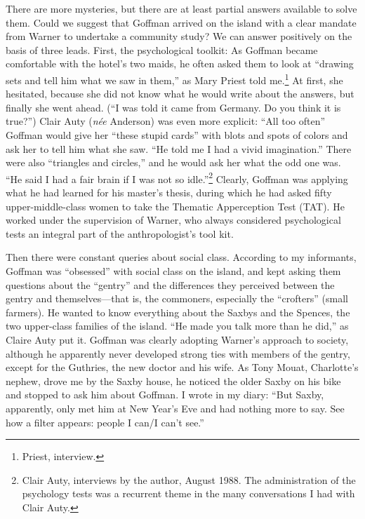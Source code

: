 \documentclass[openany,nobib]{tufte-book}
\begin{document}
There are more mysteries, but there are at least partial answers
available to solve them. Could we suggest that Goffman arrived on the
island with a clear mandate from Warner to undertake a community study?
We can answer positively on the basis of three leads. First, the
psychological toolkit: As Goffman became comfortable with the hotel's
two maids, he often asked them to look at ``drawing sets and tell him
what we saw in them,'' as Mary Priest told me.\footnote{Priest,
  interview.} At first, she hesitated, because she did not know what he
would write about the answers, but finally she went ahead. (``I was told
it came from Germany. Do you think it is true?'') Clair Auty (\emph{n\'ee} Anderson) was even
more explicit: ``All too often'' Goffman would give her ``these stupid
cards'' with blots and spots of colors and ask her to tell him what she
saw. ``He told me I had a vivid imagination.'' There were also
``triangles and circles,'' and he would ask her what the odd one was.
``He said I had a fair brain if I was not so idle.''\footnote{Clair
  Auty, interviews by the author, August 1988. The administration of
  the psychology tests was a recurrent theme in the many conversations I
  had with Clair Auty.} Clearly, Goffman was applying what he had
learned for his master's thesis, during which he had asked fifty
upper-middle-class women to take the Thematic Apperception Test (TAT).
He worked under the supervision of Warner, who always considered
psychological tests an integral part of the anthropologist's tool kit.

Then there were constant queries about social class. According to my
informants, Goffman was ``obsessed'' with social class on the island,
and kept asking them questions about the ``gentry'' and the differences
they perceived between the gentry and themselves---that is, the
commoners, especially the ``crofters'' (small farmers). He wanted to
know everything about the Saxbys and the Spences, the two upper-class
families of the island. ``He made you talk more than he did,'' as Claire
Auty put it. Goffman was clearly adopting Warner's approach to society,
although he apparently never developed strong ties with members of the
gentry, except for the Guthries, the new doctor and his wife. As Tony
Mouat, Charlotte's nephew, drove me by the Saxby house, he noticed the
older Saxby on his bike and stopped to ask him about Goffman. I wrote in
my diary: ``But Saxby, apparently, only met him at New Year's Eve and
had nothing more to say. See how a filter appears: people I can/I can't
see.''
\end{document}
